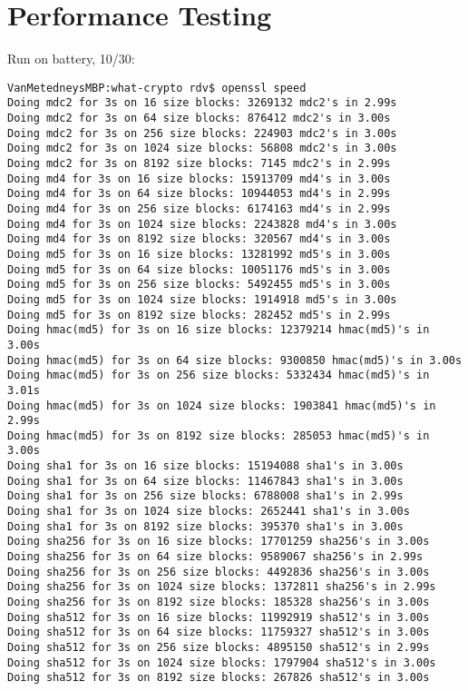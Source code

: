 \documentclass[%
 aip,
 jmp,%
 amsmath,amssymb,
 reprint,%
]{revtex4-1}
\begin{document}
\section{Performance Testing}

Run on battery, 10/30:

\begin{verbatim}
VanMetedneysMBP:what-crypto rdv$ openssl speed
Doing mdc2 for 3s on 16 size blocks: 3269132 mdc2's in 2.99s
Doing mdc2 for 3s on 64 size blocks: 876412 mdc2's in 3.00s
Doing mdc2 for 3s on 256 size blocks: 224903 mdc2's in 3.00s
Doing mdc2 for 3s on 1024 size blocks: 56808 mdc2's in 3.00s
Doing mdc2 for 3s on 8192 size blocks: 7145 mdc2's in 2.99s
Doing md4 for 3s on 16 size blocks: 15913709 md4's in 3.00s
Doing md4 for 3s on 64 size blocks: 10944053 md4's in 2.99s
Doing md4 for 3s on 256 size blocks: 6174163 md4's in 2.99s
Doing md4 for 3s on 1024 size blocks: 2243828 md4's in 3.00s
Doing md4 for 3s on 8192 size blocks: 320567 md4's in 3.00s
Doing md5 for 3s on 16 size blocks: 13281992 md5's in 3.00s
Doing md5 for 3s on 64 size blocks: 10051176 md5's in 3.00s
Doing md5 for 3s on 256 size blocks: 5492455 md5's in 3.00s
Doing md5 for 3s on 1024 size blocks: 1914918 md5's in 3.00s
Doing md5 for 3s on 8192 size blocks: 282452 md5's in 2.99s
Doing hmac(md5) for 3s on 16 size blocks: 12379214 hmac(md5)'s in 3.00s
Doing hmac(md5) for 3s on 64 size blocks: 9300850 hmac(md5)'s in 3.00s
Doing hmac(md5) for 3s on 256 size blocks: 5332434 hmac(md5)'s in 3.01s
Doing hmac(md5) for 3s on 1024 size blocks: 1903841 hmac(md5)'s in 2.99s
Doing hmac(md5) for 3s on 8192 size blocks: 285053 hmac(md5)'s in 3.00s
Doing sha1 for 3s on 16 size blocks: 15194088 sha1's in 3.00s
Doing sha1 for 3s on 64 size blocks: 11467843 sha1's in 3.00s
Doing sha1 for 3s on 256 size blocks: 6788008 sha1's in 2.99s
Doing sha1 for 3s on 1024 size blocks: 2652441 sha1's in 3.00s
Doing sha1 for 3s on 8192 size blocks: 395370 sha1's in 3.00s
Doing sha256 for 3s on 16 size blocks: 17701259 sha256's in 3.00s
Doing sha256 for 3s on 64 size blocks: 9589067 sha256's in 2.99s
Doing sha256 for 3s on 256 size blocks: 4492836 sha256's in 3.00s
Doing sha256 for 3s on 1024 size blocks: 1372811 sha256's in 2.99s
Doing sha256 for 3s on 8192 size blocks: 185328 sha256's in 3.00s
Doing sha512 for 3s on 16 size blocks: 11992919 sha512's in 3.00s
Doing sha512 for 3s on 64 size blocks: 11759327 sha512's in 3.00s
Doing sha512 for 3s on 256 size blocks: 4895150 sha512's in 2.99s
Doing sha512 for 3s on 1024 size blocks: 1797904 sha512's in 3.00s
Doing sha512 for 3s on 8192 size blocks: 267826 sha512's in 3.00s

\end{verbatim}
\end{document}
